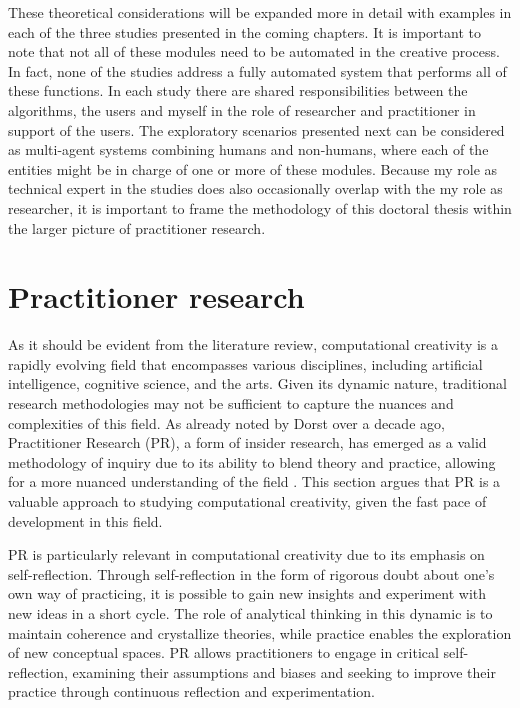 These theoretical considerations will be expanded more in detail with examples in each of the three studies presented in the coming chapters. It is important to note that not all of these modules need to be automated in the creative process. In fact, none of the studies address a fully automated system that performs all of these functions. In each study there are shared responsibilities between the algorithms, the users and myself in the role of researcher and practitioner in support of the users. The exploratory scenarios presented next can be considered as multi-agent systems combining humans and non-humans, where each of the entities might be in charge of one or more of these modules. Because my role as technical expert in the studies does also occasionally overlap with the my role as researcher, it is important to frame the methodology of this doctoral thesis within the larger picture of practitioner research. 

\section{Practitioner research}

As it should be evident from the literature review, computational creativity is a rapidly evolving field that encompasses various disciplines, including artificial intelligence, cognitive science, and the arts. Given its dynamic nature, traditional research methodologies may not be sufficient to capture the nuances and complexities of this field. As already noted by Dorst over a decade ago, 
Practitioner Research (PR), a form of insider research, has emerged as a valid methodology of inquiry due to its ability to blend theory and practice, allowing for a more nuanced understanding of the field \citep{Candy2011}. This section argues that PR is a valuable approach to studying computational creativity, given the fast pace of development in this field.

PR is particularly relevant in computational creativity due to its emphasis on self-reflection. Through self-reflection in the form of rigorous doubt about one's own way of practicing, it is possible to gain new insights and experiment with new ideas in a short cycle. The role of analytical thinking in this dynamic is to maintain coherence and crystallize theories, while practice enables the exploration of new conceptual spaces. PR allows practitioners to engage in critical self-reflection, examining their assumptions and biases and seeking to improve their practice through continuous reflection and experimentation.

